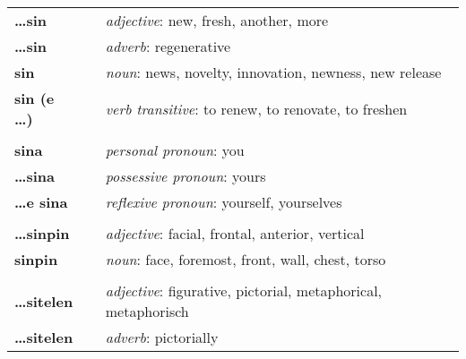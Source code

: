 \begin{supertabular}{p{2,5cm}|ll}
    \textbf{\dots sin}           &  & \textit{adjective}: new, fresh, another, more                                                              \\
    \textbf{ \dots sin }         &  & \textit{adverb}: regenerative                                                                              \\
    \textbf{sin}                 &  & \textit{noun}: news, novelty, innovation, newness, new release                                             \\
    \textbf{sin (e \dots)}       &  & \textit{verb transitive}: to renew, to renovate, to freshen                                                \\
                                 &  &                                                                                                            \\ %
    \textbf{sina}                &  & \textit{personal pronoun}: you                                                                             \\
    \textbf{\dots sina}          &  & \textit{possessive pronoun}: yours                                                                         \\
    \textbf{\dots e sina}        &  & \textit{reflexive pronoun}: yourself, yourselves                                                           \\
                                 &  &                                                                                                            \\ %
    \textbf{\dots sinpin}        &  & \textit{adjective}: facial, frontal, anterior, vertical                                                    \\
    \textbf{sinpin}              &  & \textit{noun}: face, foremost, front, wall, chest, torso                                                   \\
                                 &  &                                                                                                            \\ %
    \textbf{\dots sitelen}       &  & \textit{adjective}: figurative, pictorial, metaphorical, metaphorisch                                      \\
    \textbf{\dots sitelen}       &  & \textit{adverb}: pictorially                                                                               \\

\end{supertabular}
